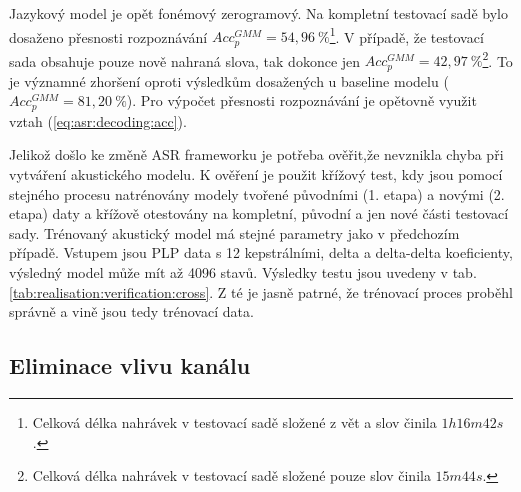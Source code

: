 Jazykový model je opět fonémový zerogramový.
Na kompletní testovací sadě bylo dosaženo přesnosti rozpoznávání $Acc_{p}^{GMM} = 54,96\ \%$\footnote{Celková délka nahrávek v testovací sadě složené z vět a slov činila $1h16m42s$.}.
V případě, že testovací sada obsahuje pouze nově nahraná slova, tak dokonce jen $Acc_{p}^{GMM} = 42,97\ \%$\footnote{Celková délka nahrávek v testovací sadě složené pouze slov činila $15m44s$.}.
To je významné zhoršení oproti výsledkům dosažených u baseline modelu ($Acc_{p}^{GMM} = 81,20\ \%$).
Pro výpočet přesnosti rozpoznávání je opětovně využit vztah (\ref{eq:asr:decoding:acc}).

Jelikož došlo ke změně ASR frameworku je potřeba ověřit,že nevznikla chyba při vytváření akustického modelu.
K ověření je použit křížový test, kdy jsou pomocí stejného procesu natrénovány modely tvořené původními (1. etapa) a novými (2. etapa) daty a křížově otestovány na kompletní, původní a jen nové části testovací sady.
Trénovaný akustický model má stejné parametry jako v předchozím případě.
Vstupem jsou PLP data s 12 kepstrálními, delta a delta-delta koeficienty, výsledný model může mít až 4096 stavů.
Výsledky testu jsou uvedeny v tab. \ref{tab:realisation:verification:cross}.
Z té je jasně patrné, že trénovací proces proběhl správně a vině jsou tedy trénovací data.


\begin{table}[htpb]
  \centering
  \def\arraystretch{1.5}
  \caption[Křížový test s CMN.]{Křížový test modelů natrénovaných a otestovaných na datech z 1. a 2. etapy.}
  \label{tab:realisation:verification:cross}
\end{table}


\subsection{Eliminace vlivu kanálu}
\label{chap:realisation:corpus:elimination}

